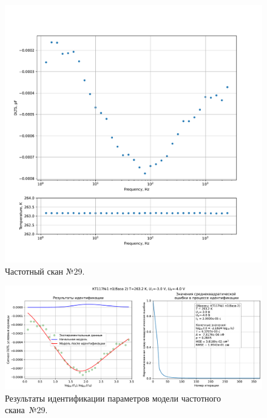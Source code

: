 \begin{figure}[!ht]
    \centering
    \includegraphics[width=1\textwidth]{../plots/КТ117№1_п1(база 2)_2500Гц-1Гц_1пФ_-10С_-3В-4В_20мВ_20мкс_шаг_0,1.pdf}
    \caption{Частотный скан №29.}
    \label{pic:frequency_scan_29}
\end{figure}

\begin{figure}[!ht]
    \centering
    \includegraphics[width=1\textwidth]{../plots/КТ117№1_п1(база 2)_2500Гц-1Гц_1пФ_-10С_-3В-4В_20мВ_20мкс_шаг_0,1_model.pdf}
    \caption{Результаты идентификации параметров модели частотного скана~№29.}
    \label{pic:frequency_scan_model29}
\end{figure}

\pagebreak


